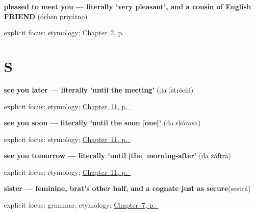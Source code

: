 \noindent\begin{minipage}[t]{\linewidth}
\raggedright
\textbf{pleased to meet you — literally 'very pleasant', and a cousin of English FRIEND}\enspace\emph{ }\enspace(óchen priyátno)\par
\footnotesize explicit focus: etymology; \hyperref[ch:russian-introductions]{Chapter~2, p.~\pageref*{ch:russian-introductions}}
\end{minipage}\par\smallskip

\section*{S}

\noindent\begin{minipage}[t]{\linewidth}
\raggedright
\textbf{see you later — literally 'until the meeting'}\enspace\emph{ }\enspace(da fstréchi)\par
\footnotesize explicit focus: etymology; \hyperref[ch:russian-parting-words]{Chapter~11, p.~\pageref*{ch:russian-parting-words}}
\end{minipage}\par\smallskip

\noindent\begin{minipage}[t]{\linewidth}
\raggedright
\textbf{see you soon — literally 'until the soon {[}one{]}'}\enspace\emph{ }\enspace(da skórava)\par
\footnotesize explicit focus: etymology; \hyperref[ch:russian-parting-words]{Chapter~11, p.~\pageref*{ch:russian-parting-words}}
\end{minipage}\par\smallskip

\noindent\begin{minipage}[t]{\linewidth}
\raggedright
\textbf{see you tomorrow — literally 'until {[}the{]} morning-after'}\enspace\emph{ }\enspace(da záftra)\par
\footnotesize explicit focus: etymology; \hyperref[ch:russian-parting-words]{Chapter~11, p.~\pageref*{ch:russian-parting-words}}
\end{minipage}\par\smallskip

\noindent\begin{minipage}[t]{\linewidth}
\raggedright
\textbf{sister — feminine, brat's other half, and a cognate just as secure}\enspace\emph{}\enspace(sestrá)\par
\footnotesize explicit focus: grammar, etymology; \hyperref[ch:russian-friend-and-siblings]{Chapter~7, p.~\pageref*{ch:russian-friend-and-siblings}}
\end{minipage}\par\smallskip

